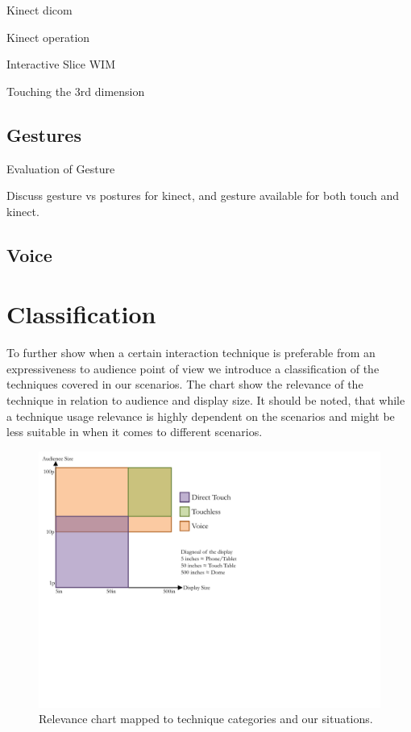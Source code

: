 \documentclass[review,journal]{vgtc}         %
\begin{document}
Kinect dicom \cite{zora82163}

Kinect operation \cite{OHaraGSPVMCCRDC14}

Interactive Slice WIM \cite{Coffey:2012:ISW:2360744.2360843}


Touching the 3rd dimension \cite{DBLP:journals/dagstuhl-reports/KeefeKSR12}

\subsection{Gestures}

Evaluation of Gesture \cite{Kirmizibayrak:2011:EGB:2087756.2087764}

Discuss gesture vs postures \cite{isenberg:hal-00781237} for kinect, and gesture available for both touch and kinect.

\subsection{Voice}

\section{Classification}

To further show when a certain interaction technique is preferable from an expressiveness to audience point of view we introduce a classification of the techniques covered in our scenarios. The chart show the relevance of the technique in relation to audience and display size. It should be noted, that while a technique usage relevance is highly dependent on the scenarios and might be less suitable in when it comes to different scenarios.

\begin{figure}[htb]
	\centering
	\includegraphics[width=1.0\linewidth]{classifiy_diagram.pdf}
	\caption{Relevance chart mapped to technique categories and our situations.}
	\label{classifiy_diagram}
\end{figure}
\end{document}
